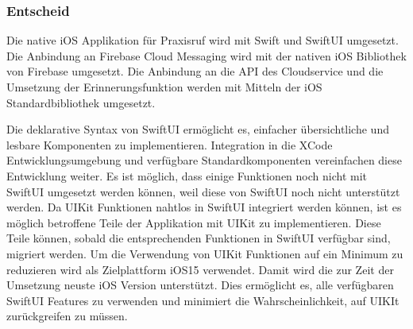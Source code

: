 \clearpage

\subsubsection{Entscheid}

Die native iOS Applikation für Praxisruf wird mit Swift und SwiftUI umgesetzt.
Die Anbindung an Firebase Cloud Messaging wird mit der nativen iOS Bibliothek von Firebase umgesetzt.
Die Anbindung an die API des Cloudservice und die Umsetzung der Erinnerungsfunktion werden mit Mitteln der iOS Standardbibliothek umgesetzt.

Die deklarative Syntax von SwiftUI ermöglicht es, einfacher übersichtliche und lesbare Komponenten zu implementieren.
Integration in die XCode Entwicklungsumgebung und verfügbare Standardkomponenten vereinfachen diese Entwicklung weiter.
Es ist möglich, dass einige Funktionen noch nicht mit SwiftUI umgesetzt werden können, weil diese von SwiftUI noch nicht unterstützt werden.
Da UIKit Funktionen nahtlos in SwiftUI integriert werden können, ist es möglich betroffene Teile der Applikation mit UIKit zu implementieren.
Diese Teile können, sobald die entsprechenden Funktionen in SwiftUI verfügbar sind, migriert werden.
Um die Verwendung von UIKit Funktionen auf ein Minimum zu reduzieren wird als Zielplattform iOS15 verwendet.
Damit wird die zur Zeit der Umsetzung neuste iOS Version unterstützt.
Dies ermöglicht es, alle verfügbaren SwiftUI Features zu verwenden und minimiert die Wahrscheinlichkeit, auf UIKIt zurückgreifen zu müssen.

\clearpage
